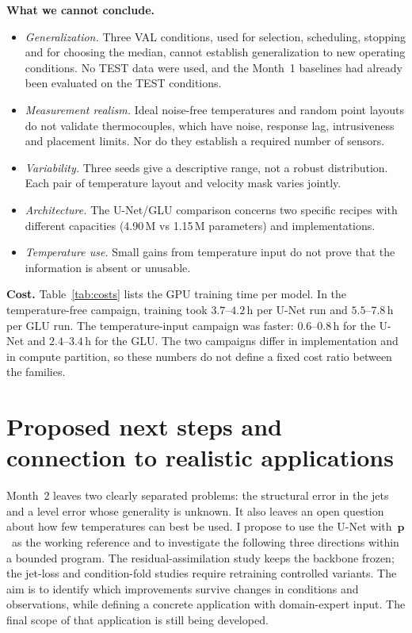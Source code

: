 \documentclass[11pt,letterpaper]{article}
\newcommand{\pon}{with~$\mathbf{p}$}
\begin{document}
\textbf{What we cannot conclude.}
\begin{itemize}
  \item \emph{Generalization.} Three VAL conditions, used for selection, scheduling, stopping and for choosing the median, cannot establish generalization to new operating conditions. No TEST data were used, and the Month~1 baselines had already been evaluated on the TEST conditions.
  \item \emph{Measurement realism.} Ideal noise-free temperatures and random point layouts do not validate thermocouples, which have noise, response lag, intrusiveness and placement limits. Nor do they establish a required number of sensors.
  \item \emph{Variability.} Three seeds give a descriptive range, not a robust distribution. Each pair of temperature layout and velocity mask varies jointly.
  \item \emph{Architecture.} The U-Net/GLU comparison concerns two specific recipes with different capacities (4.90\,M vs 1.15\,M parameters) and implementations.
  \item \emph{Temperature use.} Small gains from temperature input do not prove that the information is absent or unusable.
\end{itemize}

\textbf{Cost.} Table~\ref{tab:costs} lists the GPU training time per model. In the temperature-free campaign, training took $3.7$--$4.2$\,h per U-Net run and $5.5$--$7.8$\,h per GLU run. The temperature-input campaign was faster: $0.6$--$0.8$\,h for the U-Net and $2.4$--$3.4$\,h for the GLU. The two campaigns differ in implementation and in compute partition, so these numbers do not define a fixed cost ratio between the families.

\section{Proposed next steps and connection to realistic applications}
\label{sec:month3}

Month~2 leaves two clearly separated problems: the structural error in the jets and a level error whose generality is unknown. It also leaves an open question about how few temperatures can best be used. I propose to use the U-Net \pon\ as the working reference and to investigate the following three directions within a bounded program. The residual-assimilation study keeps the backbone frozen; the jet-loss and condition-fold studies require retraining controlled variants. The aim is to identify which improvements survive changes in conditions and observations, while defining a concrete application with domain-expert input. The final scope of that application is still being developed.
\end{document}
